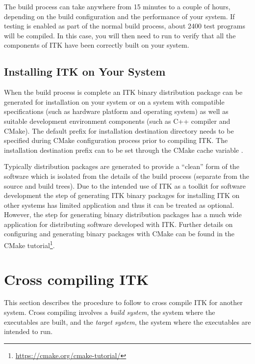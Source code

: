 The build process can take anywhere from 15 minutes to a couple of hours,
depending on the build configuration and the performance of your
system. If testing is enabled as part of the normal build process,
about 2400 test programs will be compiled. In this case, you will then need
to run  to verify that all the components of ITK have been correctly built
on your system.

\subsection{Installing ITK on Your System}%
\label{sec:Installation}%

When the build process is complete an ITK binary distribution package can be
generated for installation on your system or on a system with compatible
specifications (such as hardware platform and operating system) as well as
suitable development environment components (such as C++ compiler and CMake).
The default prefix for installation destination directory needs to be specified
during CMake configuration process prior to compiling ITK. The installation
destination prefix can to be set through the CMake cache variable
.

Typically distribution packages are generated to provide a ``clean'' form of the
software which is isolated from the details of the build process (separate from
the source and build trees). Due to the intended use of ITK as a toolkit for
software development the step of generating ITK binary packages for installing
ITK on other systems has limited application and thus it can be treated as
optional. However, the step for generating binary distribution packages has a
much wide application for distributing software developed with ITK. Further
details on configuring and generating binary packages with CMake can be found in
the CMake tutorial\footnote{\url{https://cmake.org/cmake-tutorial/}}.

\section{Cross compiling ITK}%
\label{sec:CrossCompilingITK}

This section describes the procedure to follow to cross compile ITK for
another system. Cross compiling involves a \textit{build system}, the system
where the executables are built, and the \textit{target system}, the system
where the executables are intended to run.

